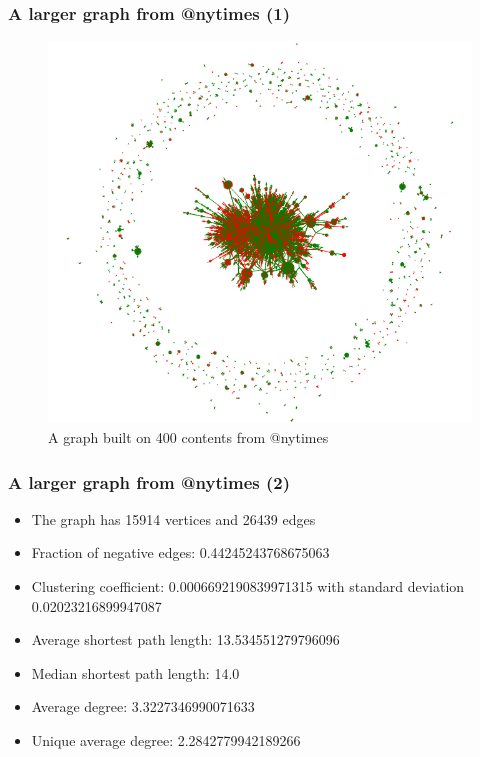 \documentclass{beamer}
\begin{document}
\begin{frame}[c]
    \frametitle{A larger graph from @nytimes (1)}
    \begin{figure}[htpb]
        \centering
        \includegraphics[width=0.7\linewidth]{img/nytimes-graph.png}
        \caption{A graph built on 400 contents from @nytimes}%
    \end{figure}
\end{frame}

\begin{frame}[c]
    \frametitle{A larger graph from @nytimes (2)}
    \begin{itemize}
        \item The graph has 15914 vertices and 26439 edges
        \item Fraction of negative edges: \num{0.44245243768675063}
        \item Clustering coefficient: \num{0.0006692190839971315} with standard
            deviation \num{0.02023216899947087}
        \item Average shortest path length: \num{13.534551279796096}
        \item Median shortest path length: 14.0
        \item Average degree: \num{3.3227346990071633}
        \item Unique average degree: \num{2.2842779942189266}
    \end{itemize}
\end{frame}
\end{document}
